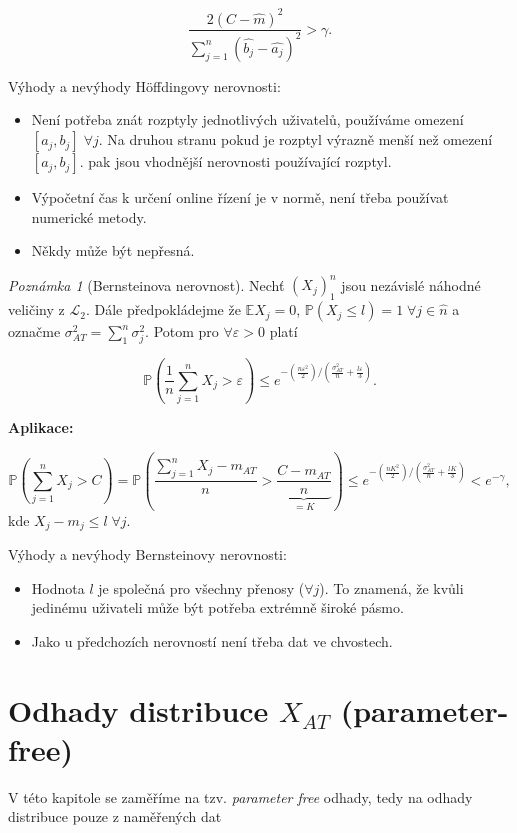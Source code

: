 \documentclass{article}
\theoremstyle{remark}
\newtheorem*{remark}{Poznámka}
\theoremstyle{plain}
\theoremstyle{definition}
\theoremstyle{remark}
\begin{document}
$$
\frac{2\left(C-\hat{m}\right)^2}{\sum_{j=1}^{n}\left(\hat{b_j}-\hat{a_j}\right)^2} > \gamma.
$$

Výhody a nevýhody H\"offdingovy nerovnosti:
\begin{itemize}
    \item Není potřeba znát rozptyly jednotlivých uživatelů, používáme omezení $\left[a_j,b_j\right] \; \forall j$. Na druhou stranu pokud je rozptyl výrazně menší než omezení $\left[a_j,b_j\right]$. pak jsou vhodnější nerovnosti používající rozptyl.
    \item Výpočetní čas k určení online řízení je v normě, není třeba používat numerické metody.
    \item Někdy může být nepřesná.

\end{itemize}

\begin{remark}[Bernsteinova nerovnost]
Nechť $\left(X_j\right)_1^n$ jsou nezávislé náhodné veličiny z $\mathscr{L}_2$. Dále předpokládejme že $\mathbb{E}X_j = 0$, $\mathbb{P}\left(X_j \leq l\right) = 1 \; \forall j \in \hat{n}$ a označme $\sigma_{AT}^2 = \sum_{1}^n \sigma_j^2$. Potom pro $\forall \varepsilon > 0$ platí 

$$
\mathbb{P}\left(\frac{1}{n}\sum_{j=1}^n X_j > \varepsilon \right) \leq e^{-\left(\frac{n\varepsilon^2}{2}\right)/\left(\frac{\sigma_{AT}^2}{n} + \frac{l\varepsilon}{3}\right)}.
$$
\end{remark}

\textbf{Aplikace:}

$$
\mathbb{P}\left(\sum_{j=1}^n X_j > C \right) = \mathbb{P}\left(\frac{\sum_{j=1}^n X_j - m_{AT} }{n} > \underbrace{\frac{C - m_{AT}}{n}}_{=K} \right) \leq e^{-\left(\frac{nK^2}{2}\right)/\left(\frac{\sigma_{AT}^2}{n} + \frac{lK}{3}\right)} < e^{-\gamma},
$$
kde $X_j - m_j \leq l \; \forall j$.

Výhody a nevýhody Bernsteinovy nerovnosti:
\begin{itemize}
    \item Hodnota $l$ je společná pro všechny přenosy ($\forall j$). To znamená, že kvůli jedinému uživateli může být potřeba extrémně široké pásmo.
    \item Jako u předchozích nerovností není třeba dat ve chvostech.

\end{itemize}
\newpage
\section{Odhady distribuce $X_{AT}$ (parameter-free)}
V této kapitole se zaměříme na tzv. \textit{parameter free} odhady, tedy na odhady distribuce pouze z naměřených dat
\end{document}
